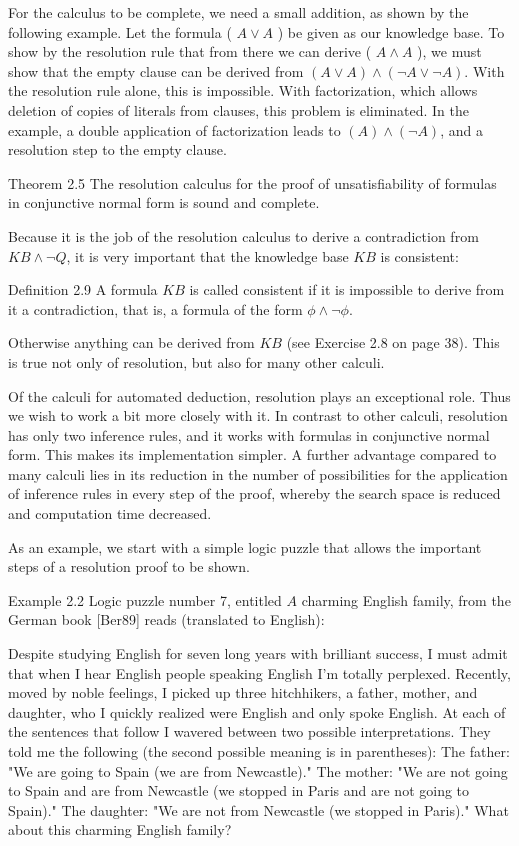 \documentclass[10pt]{article}
\begin{document}
For the calculus to be complete, we need a small addition, as shown by the following example. Let the formula ( $A \vee A$ ) be given as our knowledge base. To show by the resolution rule that from there we can derive ( $A \wedge A$ ), we must show that the empty clause can be derived from $(A \vee A) \wedge(\neg A \vee \neg A)$. With the resolution rule alone, this is impossible. With factorization, which allows deletion of copies of literals from clauses, this problem is eliminated. In the example, a double application of factorization leads to $(A) \wedge(\neg A)$, and a resolution step to the empty clause.

\begin{displayquote}
Theorem 2.5 The resolution calculus for the proof of unsatisfiability of formulas in conjunctive normal form is sound and complete.
\end{displayquote}

Because it is the job of the resolution calculus to derive a contradiction from $K B \wedge \neg Q$, it is very important that the knowledge base $K B$ is consistent:

Definition 2.9 A formula $K B$ is called consistent if it is impossible to derive from it a contradiction, that is, a formula of the form $\phi \wedge \neg \phi$.

Otherwise anything can be derived from $K B$ (see Exercise 2.8 on page 38). This is true not only of resolution, but also for many other calculi.

Of the calculi for automated deduction, resolution plays an exceptional role. Thus we wish to work a bit more closely with it. In contrast to other calculi, resolution has only two inference rules, and it works with formulas in conjunctive normal form. This makes its implementation simpler. A further advantage compared to many calculi lies in its reduction in the number of possibilities for the application of inference rules in every step of the proof, whereby the search space is reduced and computation time decreased.

As an example, we start with a simple logic puzzle that allows the important steps of a resolution proof to be shown.

Example 2.2 Logic puzzle number 7, entitled $A$ charming English family, from the German book [Ber89] reads (translated to English):

Despite studying English for seven long years with brilliant success, I must admit that when I hear English people speaking English I'm totally perplexed. Recently, moved by noble feelings, I picked up three hitchhikers, a father, mother, and daughter, who I quickly realized were English and only spoke English. At each of the sentences that follow I wavered between two possible interpretations. They told me the following (the second possible meaning is in parentheses): The father: "We are going to Spain (we are from Newcastle)." The mother: "We are not going to Spain and are from Newcastle (we stopped in Paris and are not going to Spain)." The daughter: "We are not from Newcastle (we stopped in Paris)." What about this charming English family?
\end{document}
